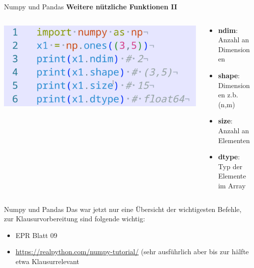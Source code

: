 \documentclass[aspectratio=169]{beamer}
\begin{document}
\begin{frame}{Numpy und Pandas}
    \textbf{Weitere nützliche Funktionen II}
    \begin{columns}
        \begin{column}{0.5\textwidth}
            \begin{tcolorbox}[colframe=oxfordblue, colback=blue!10, coltitle=white, title=Python]
                \includegraphics[width=\textwidth]{images/code_numpyothercommands.png}
            \end{tcolorbox}
        \end{column}
        \begin{column}{0.5\textwidth}
            \begin{itemize}
                \item \textbf{ndim}: Anzahl an Dimensionen
                \item \textbf{shape}: Dimensionen z.b. (n,m)
                \item \textbf{size}: Anzahl an Elementen
                \item \textbf{dtype}: Typ der Elemente im Array
            \end{itemize}
        \end{column}
    \end{columns}
    
\end{frame}

\begin{frame}{Numpy und Pandas}
    Das war jetzt nur eine Übersicht der wichtigesten Befehle, zur Klausurvorbereitung sind folgende wichtig:
    \begin{itemize}
        \item EPR Blatt 09
        \item \href{https://realpython.com/numpy-tutorial/}{https://realpython.com/numpy-tutorial/} (sehr ausführlich aber bis zur hälfte etwa Klausurrelevant
    \end{itemize}
\end{frame}
\end{document}
